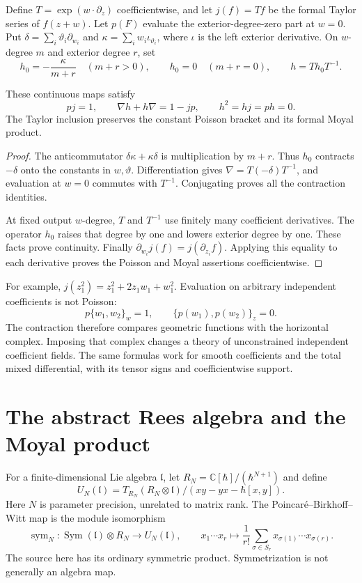 Define $T=\exp(w\cdot\partial_z)$ coefficientwise, and let
$j(f)=Tf$ be the formal Taylor series of $f(z+w)$.
Let $p(F)$ evaluate the exterior-degree-zero part at $w=0$.
Put $\delta=\sum_i\vartheta_i\partial_{w_i}$ and
$\kappa=\sum_iw_i\iota_{\vartheta_i}$, where $\iota$ is the left
exterior derivative. On $w$-degree $m$ and exterior degree $r$, set
\[
 h_0=-\frac{\kappa}{m+r}\quad(m+r>0),\qquad
 h_0=0\quad(m+r=0),\qquad h=Th_0T^{-1}.
\]

\begin{proposition}\label{mht:prop:physical-spencer}
These continuous maps satisfy
\[
 pj=1,\qquad \nabla h+h\nabla=1-jp,\qquad
 h^2=hj=ph=0.
\]
The Taylor inclusion preserves the constant Poisson bracket and
its formal Moyal product.
\end{proposition}

\begin{proof}
The anticommutator $\delta\kappa+\kappa\delta$ is multiplication
by $m+r$. Thus $h_0$ contracts $-\delta$ onto the constants in
$w,\vartheta$. Differentiation gives
$\nabla=T(-\delta)T^{-1}$, and evaluation at $w=0$ commutes with
$T^{-1}$. Conjugating proves all the contraction identities.

At fixed output $w$-degree, $T$ and $T^{-1}$ use finitely many
coefficient derivatives. The operator $h_0$ raises that degree by
one and lowers exterior degree by one. These facts prove continuity.
Finally $\partial_{w_i}j(f)=j(\partial_{z_i}f)$.
Applying this equality to each derivative proves the Poisson and
Moyal assertions coefficientwise.
\end{proof}

For example,
$j(z_1^2)=z_1^2+2z_1w_1+w_1^2$.
Evaluation on arbitrary independent coefficients is not Poisson:
\[
 p\{w_1,w_2\}_w=1,\qquad \{p(w_1),p(w_2)\}_z=0.
\]
The contraction therefore compares geometric functions with the
horizontal complex. Imposing that complex changes a theory of
unconstrained independent coefficient fields. The same formulas
work for smooth coefficients and the total mixed differential,
with its tensor signs and coefficientwise support.

\section{The abstract Rees algebra and the Moyal product}

For a finite-dimensional Lie algebra $\mathfrak l$, let
$R_N=\mathbb C[\hbar]/(\hbar^{N+1})$ and define
\[
 U_N(\mathfrak l)=
 T_{R_N}(R_N\otimes\mathfrak l)/
       (xy-yx-\hbar[x,y]).
\]
Here $N$ is parameter precision, unrelated to matrix rank.
The Poincar\'e--Birkhoff--Witt map is the module isomorphism
\[
 \operatorname{sym}_N:
 \operatorname{Sym}(\mathfrak l)\otimes R_N
 \longrightarrow U_N(\mathfrak l),\qquad
 x_1\cdots x_r\longmapsto
 \frac1{r!}\sum_{\sigma\in S_r}x_{\sigma(1)}\cdots x_{\sigma(r)}.
\]
The source here has its ordinary symmetric product. Symmetrization
is not generally an algebra map.

